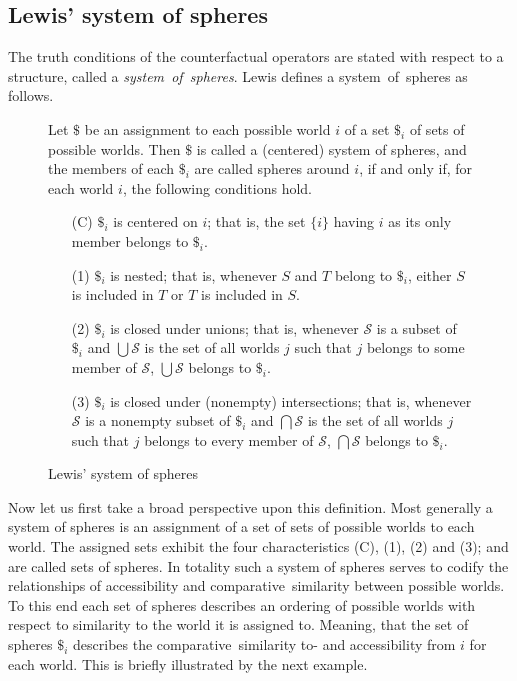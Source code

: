 \documentclass[a4paper,american,10pt]{paper}
\theoremstyle{definition}\newtheorem{definition}{Definition}
\begin{document}
\subsection{Lewis' system of spheres}
The truth conditions of the counterfactual operators are stated with respect to a structure, called a \textit{system~of~spheres}. Lewis defines a system~of~spheres as follows.
\begin{figure}[H]
	Let $\$$ be an assignment to each possible world $i$ of a set $\$_i$ of sets of possible worlds. Then $\$$ is called a (centered) system of spheres, and the members of each $\$_i$ are called spheres around $i$, if and only if, for each world $i$, the following conditions hold.
	\begin{itemize}
	\item[(C)] $\$_i$ is centered on $i$; that is, the set $\{i\}$ having $i$ as its only member belongs to $\$_i$.
	\item[(1)] $\$_i$ is nested; that is, whenever $S$ and $T$ belong to $\$_i$, either $S$ is included in $T$ or $T$ is included in $S$.
	\item[(2)] $\$_i$ is closed under unions; that is, whenever $\mathscr{S}$ is a subset of $\$_i$ and $\bigcup\mathscr{S}$ is the set of all worlds $j$ such that $j$ belongs to some member of $\mathscr{S}$, $\bigcup\mathscr{S}$ belongs to $\$_i$.
	\item[(3)] $\$_i$ is closed under (nonempty) intersections; that is, whenever $\mathscr{S}$ is a nonempty subset of $\$_i$ and $\bigcap\mathscr{S}$ is the set of all worlds $j$ such that $j$ belongs to every member of $\mathscr{S}$, $\bigcap\mathscr{S}$ belongs to $\$_i$.
	\end{itemize}
	\caption{Lewis' system of spheres}
	\label{fig:system_of_spheres}
\end{figure}
\noindent Now let us first take a broad perspective upon this definition. Most generally a system of spheres is an assignment of a set of sets of possible worlds to each world. The assigned sets exhibit the four characteristics (C), (1), (2) and (3); and are called sets of spheres. In totality such a system of spheres serves to codify the relationships of accessibility and comparative~similarity between possible worlds. To this end each set of spheres describes an ordering of possible worlds with respect to similarity to the world it is assigned to. Meaning, that the set of spheres $\$_i$ describes the comparative~similarity to- and accessibility from $i$ for each world. This is briefly illustrated by the next example.
\end{document}
